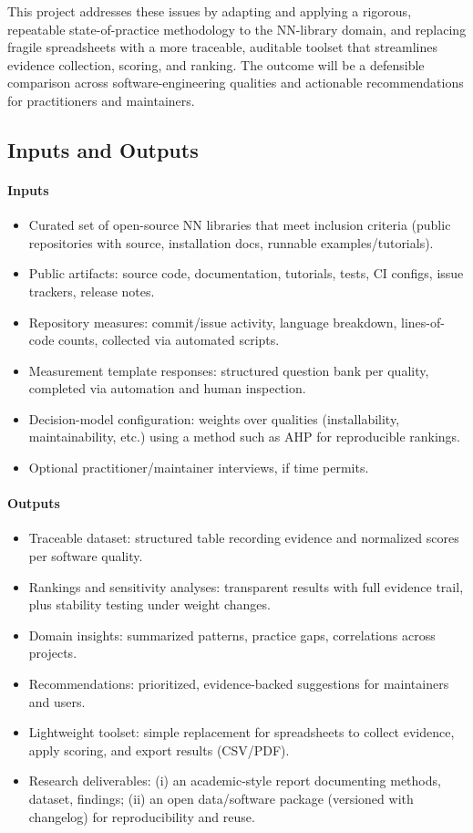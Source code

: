 \documentclass{article}
\begin{document}
This project addresses these issues by adapting and applying a rigorous,
repeatable state-of-practice methodology to the NN-library domain, and
replacing fragile spreadsheets with a more traceable, auditable toolset that
streamlines evidence collection, scoring, and ranking. The outcome will be a
defensible comparison across software-engineering qualities and actionable
recommendations for practitioners and maintainers.


\subsection{Inputs and Outputs}
\paragraph{Inputs}
\begin{itemize}
  \item Curated set of open-source NN libraries that meet inclusion criteria
  (public repositories with source, installation docs, runnable examples/tutorials).
  \item Public artifacts: source code, documentation, tutorials, tests, CI configs,
  issue trackers, release notes.
  \item Repository measures: commit/issue activity, language breakdown,
  lines-of-code counts, collected via automated scripts.
  \item Measurement template responses: structured question bank per quality,
  completed via automation and human inspection.
  \item Decision-model configuration: weights over qualities (installability,
  maintainability, etc.) using a method such as AHP for reproducible rankings.
  \item Optional practitioner/maintainer interviews, if time permits.
\end{itemize}

\paragraph{Outputs}
\begin{itemize}
  \item Traceable dataset: structured table recording evidence and normalized
  scores per software quality.
  \item Rankings and sensitivity analyses: transparent results with full evidence trail,
  plus stability testing under weight changes.
  \item Domain insights: summarized patterns, practice gaps, correlations across projects.
  \item Recommendations: prioritized, evidence-backed suggestions for maintainers and users.
  \item Lightweight toolset: simple replacement for spreadsheets to collect evidence,
  apply scoring, and export results (CSV/PDF).
  \item Research deliverables: (i) an academic-style report documenting methods,
  dataset, findings; (ii) an open data/software package (versioned with changelog)
  for reproducibility and reuse.
\end{itemize}
\end{document}
